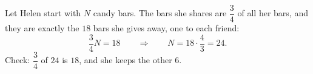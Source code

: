 Let Helen start with $N$ candy bars. The bars she shares are $\dfrac{3}{4}$ of all her bars, and they are exactly the $18$ bars she gives away, one to each friend:
\[
\dfrac{3}{4}N=18\qquad\Longrightarrow\qquad N=18\cdot\dfrac{4}{3}=\boxed{24}.
\]
Check: $\dfrac{3}{4}$ of $24$ is $18$, and she keeps the other $6$.
